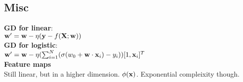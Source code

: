 \subsection{Misc}
\textbf{GD for linear}:\\
$\w' = \w - \eta (\y-f(\X;\w))$\\
\textbf{GD for logistic}:\\
$\w' = \w - \eta(\sum_{i=1}^{N}(\sigma(w_0 + \w\cdot\x_i) - y_i))[1, \x_i]^T$\\
\textbf{Feature maps}\\
Still linear, but in a higher dimension. $\phi(\x)$. Exponential compleixity though.